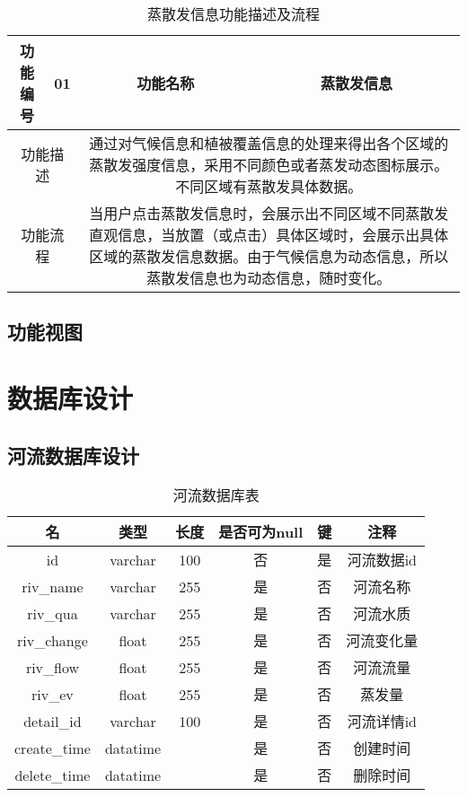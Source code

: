 \begin{table}[H]
	\centering
	\caption[蒸散发信息]{蒸散发信息功能描述及流程}
	\label{5}
	\begin{tabular}{|c|c|c|c|}
		
		\hline
		功能编号&01&功能名称&蒸散发信息\\
		\hline
		\multicolumn{2}{|c|}{功能描述}&\multicolumn{2}{c|}{\multirow{1}{0.7\textwidth}{通过对气候信息和植被覆盖信息的处理来得出各个区域的蒸散发强度信息，采用不同颜色或者蒸发动态图标展示。不同区域有蒸散发具体数据。}}\\[10ex]
		\hline
		\multicolumn{2}{|c|}{功能流程}&\multicolumn{2}{c|}{\multirow{1}{0.7\textwidth}{当用户点击蒸散发信息时，会展示出不同区域不同蒸散发直观信息，当放置（或点击）具体区域时，会展示出具体区域的蒸散发信息数据。由于气候信息为动态信息，所以蒸散发信息也为动态信息，随时变化。}}\\[16ex]
		\hline
		
		
	\end{tabular}
\end{table}




\subsection{功能视图}

\section{数据库设计}

\subsection{河流数据库设计}

\begin{table}[H]
	\centering
	\caption[河流数据]{河流数据库表}
	\begin{tabular}{cccccc}
		\toprule
		名            & 类型      & 长度 &是否可为null & 键 & 注释\\
		\midrule
		id            & varchar  & 100  & 否 & 是 & 河流数据id \\
		riv\_name     & varchar  & 255  &是  & 否 & 河流名称   \\
		riv\_qua      & varchar  & 255  &是  & 否 & 河流水质   \\
		riv\_change   & float    & 255  &是  & 否 & 河流变化量 \\
		riv\_flow     & float    & 255  &是  & 否 & 河流流量   \\
		riv\_ev       & float    & 255  & 是 & 否 & 蒸发量     \\
		detail\_id    & varchar  & 100  & 是 & 否 & 河流详情id \\
		create\_time  & datatime &      &是  & 否 & 创建时间   \\
		delete\_time  &datatime  &      & 是 & 否 & 删除时间   \\ 
		\bottomrule
	\end{tabular}
\end{table}
